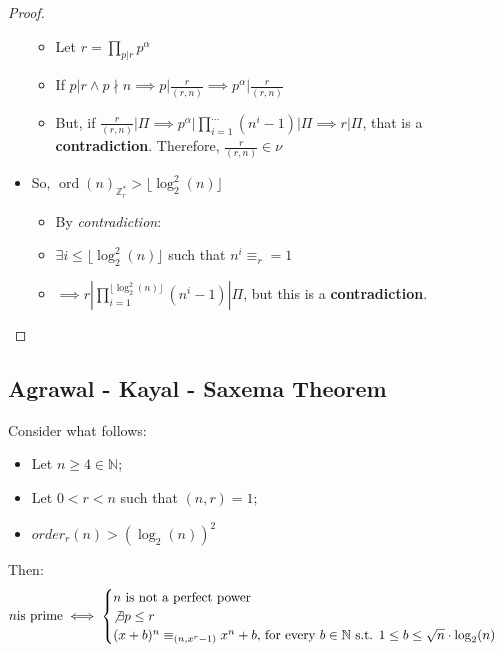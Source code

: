 \begin{proof}
\begin{itemize}
\begin{itemize}
            \item Let $r = \prod_{p|r} p^{\alpha}$
            \item If $p | r \land p \nmid n \implies p | \frac{r}{(r,n)} \implies p^{\alpha} | \frac{r}{(r,n)}$
            \item But, if $\frac{r}{(r,n)} | \Pi \implies p^{\alpha} | \prod_{i=1}^{\dots} (n^{i} - 1) | \Pi \implies r | \Pi$, that is a \textbf{contradiction}. Therefore, $\frac{r}{(r,n)} \in \nu$
        \end{itemize}
        \item So, $\operatorname{ord}(n)_{\mathbb{Z}_{r}^{*}} > \lfloor \operatorname{log}_{2}^{2}(n) \rfloor$
        \begin{itemize}
            \item By \emph{contradiction}:
            \item $\exists i \leq \lfloor \operatorname{log}_{2}^{2}(n) \rfloor$ such that $n^{i} \equiv_{r} = 1$
            \item $\implies r | \prod_{i = 1}^{\lfloor \operatorname{log}_{2}^{2}(n) \rfloor}(n^{i} - 1) | \Pi$, but this is a \textbf{contradiction}.
        \end{itemize}

    \end{itemize}
\end{proof}

\subsection{Agrawal - Kayal - Saxema Theorem}
\begin{theorem}\label{aks_theorem}
    Consider what follows:
    \begin{itemize}
        \item Let $n \geq 4 \in \mathbb{N}$;
        \item Let $0 < r < n$ such that $(n,r) = 1$;
        \item $order_{r}(n) > (\operatorname{log}_{2}(n))^{2}$
    \end{itemize}
    Then:
    \[
    n \text{is prime} \iff
         \begin{cases}
           n \text{ is not a perfect power } \\
           \not\exists p \leq r \\
           (x + b)^{n} \equiv_{(n, x^{r} - 1)} x^{n} + b \text{, for every } b \in \mathbb{N} \text{ s.t. } 1 \leq b \leq \sqrt{n} \cdot \operatorname{log}_{2}(n)
         \end{cases}
    \]
\end{theorem}

